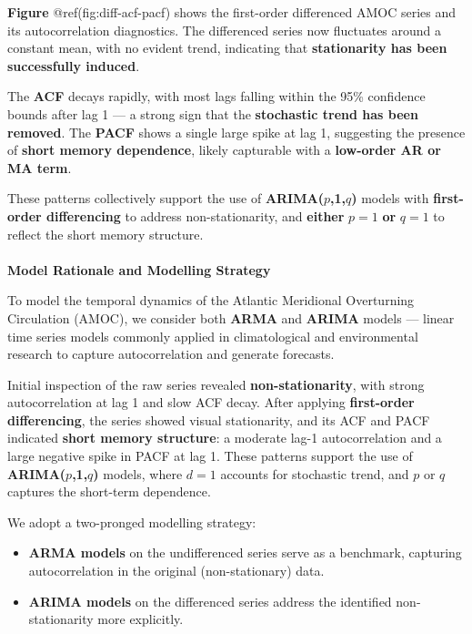\documentclass[
  11pt,
]{article}
\makeatletter
\let\oldparagraph\paragraph
\renewcommand{\paragraph}{
    \@ifstar
      \xxxParagraphStar
      \xxxParagraphNoStar
  }
\newcommand{\xxxParagraphStar}[1]{\oldparagraph*{#1}\mbox{}}
\newcommand{\xxxParagraphNoStar}[1]{\oldparagraph{#1}\mbox{}}
\makeatother
\begin{document}
\textbf{Figure} @ref(fig:diff-acf-pacf) shows the first-order
differenced AMOC series and its autocorrelation diagnostics. The
differenced series now fluctuates around a constant mean, with no
evident trend, indicating that \textbf{stationarity has been
successfully induced}.

The \textbf{ACF} decays rapidly, with most lags falling within the 95\%
confidence bounds after lag 1 --- a strong sign that the
\textbf{stochastic trend has been removed}. The \textbf{PACF} shows a
single large spike at lag 1, suggesting the presence of \textbf{short
memory dependence}, likely capturable with a \textbf{low-order AR or MA
term}.

These patterns collectively support the use of
\textbf{ARIMA(}\(p\)\textbf{,1,}\(q\)\textbf{)} models with
\textbf{first-order differencing} to address non-stationarity, and
\textbf{either} \(p=1\) \textbf{or} \(q=1\) to reflect the short memory
structure.

\paragraph{\texorpdfstring{\textbf{Model Rationale and Modelling
Strategy}}{Model Rationale and Modelling Strategy}}\label{model-rationale-and-modelling-strategy}

To model the temporal dynamics of the Atlantic Meridional Overturning
Circulation (AMOC), we consider both \textbf{ARMA} and \textbf{ARIMA}
models --- linear time series models commonly applied in climatological
and environmental research to capture autocorrelation and generate
forecasts.

Initial inspection of the raw series revealed \textbf{non-stationarity},
with strong autocorrelation at lag 1 and slow ACF decay. After applying
\textbf{first-order differencing}, the series showed visual
stationarity, and its ACF and PACF indicated \textbf{short memory
structure}: a moderate lag-1 autocorrelation and a large negative spike
in PACF at lag 1. These patterns support the use of
\textbf{ARIMA(}\(p\)\textbf{,1,}\(q\)\textbf{)} models, where \(d=1\)
accounts for stochastic trend, and \(p\) or \(q\) captures the
short-term dependence.

We adopt a two-pronged modelling strategy:

\begin{itemize}
\item
  \textbf{ARMA models} on the undifferenced series serve as a benchmark,
  capturing autocorrelation in the original (non-stationary) data.
\item
  \textbf{ARIMA models} on the differenced series address the identified
  non-stationarity more explicitly.
\end{itemize}
\end{document}
